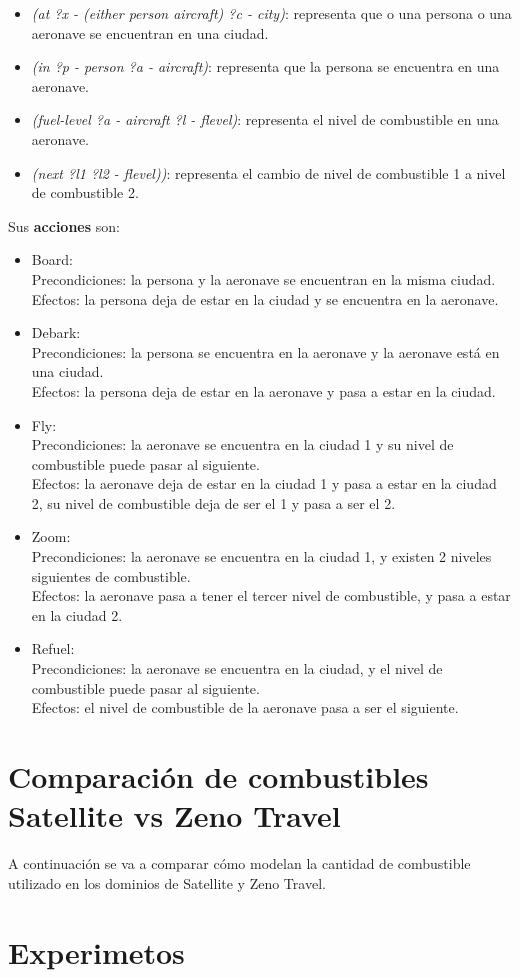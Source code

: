 \documentclass{uc3mpracticas}
\begin{document}
  \begin{itemize}
    \item \textit{(at ?x - (either person aircraft) ?c - city)}: representa que o una persona o una aeronave se encuentran en una ciudad.
  	\item \textit{(in ?p - person ?a - aircraft)}: representa que la persona se encuentra en una aeronave.
  	\item \textit{(fuel-level ?a - aircraft ?l - flevel)}: representa el nivel de combustible en una aeronave.
  	\item \textit{(next ?l1 ?l2 - flevel))}: representa el cambio de nivel de combustible 1 a nivel de combustible 2.
  \end{itemize}

  Sus \textbf{acciones} son:
  \begin{itemize}
    \item Board:
    \\Precondiciones: la persona y la aeronave se encuentran en la misma ciudad.
    \\Efectos: la persona deja de estar en la ciudad y se encuentra en la aeronave.
    \item Debark:
    \\Precondiciones: la persona se encuentra en la aeronave y la aeronave está en una ciudad.
    \\Efectos: la persona deja de estar en la aeronave y pasa a estar en la ciudad.
    \item Fly:
    \\Precondiciones: la aeronave se encuentra en la ciudad 1 y su nivel de combustible puede pasar al siguiente.
    \\Efectos: la aeronave deja de estar en la ciudad 1 y pasa a estar en la ciudad 2, su nivel de combustible deja de ser el 1 y pasa a ser el 2.
    \item Zoom:
    \\Precondiciones: la aeronave se encuentra en la ciudad 1, y existen 2 niveles siguientes de combustible.
    \\Efectos: la aeronave pasa a tener el tercer nivel de combustible, y pasa a estar en la ciudad 2.
    \item Refuel:
    \\Precondiciones: la aeronave se encuentra en la ciudad, y el nivel de combustible puede pasar al siguiente.
    \\Efectos: el nivel de combustible de la aeronave pasa a ser el siguiente.
  \end{itemize}


\section{Comparación de combustibles Satellite vs Zeno Travel}

A continuación se va a comparar cómo modelan la cantidad de combustible utilizado en los dominios de Satellite y Zeno Travel.

\section{Experimetos}
\end{document}
